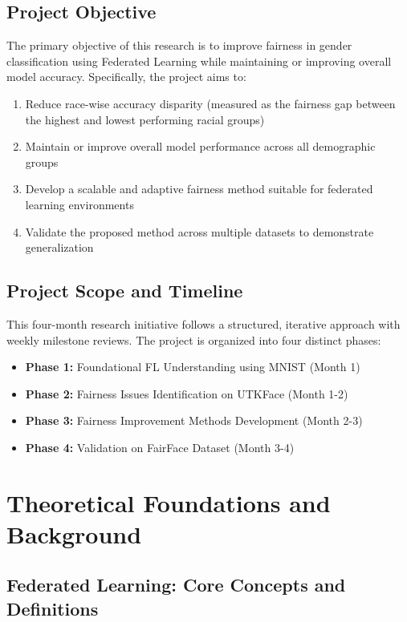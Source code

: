 \documentclass[11pt,a4paper]{report}
\begin{document}
\section{Project Objective}

The primary objective of this research is to improve fairness in gender classification using Federated Learning while maintaining or improving overall model accuracy. Specifically, the project aims to:

\begin{enumerate}
    \item Reduce race-wise accuracy disparity (measured as the fairness gap between the highest and lowest performing racial groups)
    \item Maintain or improve overall model performance across all demographic groups
    \item Develop a scalable and adaptive fairness method suitable for federated learning environments
    \item Validate the proposed method across multiple datasets to demonstrate generalization
\end{enumerate}

\section{Project Scope and Timeline}

This four-month research initiative follows a structured, iterative approach with weekly milestone reviews. The project is organized into four distinct phases:

\begin{itemize}
    \item \textbf{Phase 1:} Foundational FL Understanding using MNIST (Month 1)
    \item \textbf{Phase 2:} Fairness Issues Identification on UTKFace (Month 1-2)
    \item \textbf{Phase 3:} Fairness Improvement Methods Development (Month 2-3)
    \item \textbf{Phase 4:} Validation on FairFace Dataset (Month 3-4)
\end{itemize}

\chapter{Theoretical Foundations and Background}

\section{Federated Learning: Core Concepts and Definitions}
\end{document}
